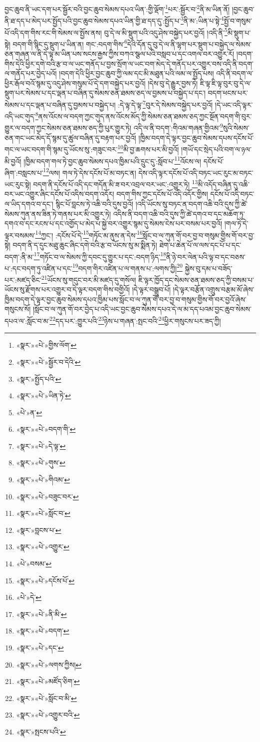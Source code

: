 བྱང་ཆུབ་ནི་ཡང་དག་པར་སྦྱོར་བའི་བྱང་ཆུབ་སེམས་དཔའ་ཡིན་:གྱི་ལྡོག་\footnote{«སྣར་»«པེ་»གྱིས་ལོག་}པར་:སྦྱོར་བ་\footnote{«སྣར་»«པེ་»སྦྱོར་བ་དེའི་}ནི་མ་ཡིན་ནོ། །བྱང་ཆུབ་ནི་ཐ་དད་པ་མེད་པར་སྤྱོད་པའི་བྱང་ཆུབ་སེམས་དཔའ་ཡིན་གྱི་ཐ་དད་དུ་:སྤྱོད་པ་\footnote{«སྣར་»སྤྱོད་པའི་}ནི་མ་:ཡིན་པ་སྟེ་\footnote{«སྣར་»«པེ་»ཡིན་ཏེ་}སྤྱོ་བ་གསུམ་པོ་འདི་དག་གིས་རང་གི་སེམས་ལ་སྤྱོས་ནས། བུ་དེ་ལ་མི་སྡུག་པའི་འདུ་ཤེས་བསྐྱེད་པར་བྱའོ། །འདི་ནི་\footnote{«པེ་»ན་}མི་སྡུག་པ་སྟེ། བདག་གི་སྙིང་དུ་སྡུག་པ་ཡིན་ན། གང་:བདག་གིས་\footnote{«སྣར་»«པེ་»བདག་གི་}དེའི་དོན་དུ་བུ་དེ་ལ་ནི་ལྷག་པར་སྡུག་པ་བསྐྱེད་ལ་སེམས་ཅན་གཞན་ལ་ནི་དེ་ལྟ་མ་ཡིན་པས་སངས་རྒྱས་ཀྱིས་བཀའ་སྩལ་པའི་བསླབ་པ་དང་འགལ་བར་འགྱུར་རོ། །བདག་གིས་དེའི་ཕྱིར་དགེ་བའི་རྩ་བ་ལ་ཡང་གནོད་པ་བྱས་སྲོག་ལ་ཡང་བག་མེད་དེ་གནོད་པར་འགྱུར་བས་འདི་ནི་བདག་ལ་གནོད་པར་བྱེད་པའོ། །བདག་དེའི་ཕྱིར་བྱང་ཆུབ་ཀྱི་ལམ་དང་མི་མཐུན་པའི་ལམ་ལ་སྤྱོད་པས། འདི་ནི་བདག་ལ་ཕྱིར་རྒོལ་བའོ་སྙམ་དུ་འདུ་ཤེས་གསུམ་པོ་དེ་དག་བསྐྱེད་པར་བྱའོ། །དེས་བུ་དེ་རྒྱུར་བྱས་ཏེ། ཇི་ལྟ་ཇི་ལྟ་བུར་བུ་དེ་ལ་སྡུག་པར་སེམས་པ་དང་ལྡན་པ་བཞིན་དུ་སེམས་ཅན་ཐམས་ཅད་ལ་བྱམས་པ་བསྐྱེད་པ་དང་། བདག་ཕངས་པར་སེམས་པ་དང་ལྡན་པ་བཞིན་དུ་བྱམས་པ་བསྐྱེད་པ། :དེ་ལྟ་དེ་ལྟ་\footnote{«སྣར་»«པེ་»དེ་ལྟ་}བུར་དེ་སེམས་བསྐྱེད་པར་བྱའོ། །དེ་ཡང་འདི་ལྟར་འདི་ཡང་གུད་\footnote{«སྣར་»«པེ་»གུས་}ནས་འོངས་ལ་བདག་ཀྱང་གུད་ནས་འོངས་མོད་ཀྱི་སེམས་ཅན་ཐམས་ཅད་ཀྱང་སྔོན་བདག་གི་བུར་གྱུར་ལ་བདག་ཀྱང་སེམས་ཅན་ཐམས་ཅད་ཀྱི་པུར་གྱུར་ཏེ། འདི་ལ་ནི་བདག་:གིའམ་གཞན་གྱིའམ་\footnote{«སྣར་»«པེ་»གིའམ་}སུའི་སེམས་ཅན་གང་ཡང་མེད་དོ་སྙམ་དུ་ཚུལ་བཞིན་དུ་བརྟག་པར་བྱའོ། །ཁྱིམ་བདག་དེ་ལྟར་བྱང་ཆུབ་སེམས་དཔས་དངོས་པོ་གང་ལ་ཡང་བདག་གི་སྙམ་དུ་ཡོངས་སུ་:གཟུང་བར་\footnote{«སྣར་»«པེ་»བཟུང་བར་}མི་བྱ་ཆགས་པར་མི་བྱའོ། །གཡོ་དང་སྲེད་པའི་བག་ལ་ཉལ་མི་བྱའོ། །ཁྱིམ་བདག་གལ་ཏེ་བྱང་ཆུབ་སེམས་དཔའ་ཁྱིམ་པའི་དྲུང་དུ་:སློབ་པ་\footnote{«སྣར་»«པེ་»སློང་བ་}འོངས་ལ། དངོས་པོ་ཞིག་:བསླངས་པ་\footnote{«སྣར་»བླངས་པ་}ལས། གལ་ཏེ་དེས་དངོས་པོ་མ་བཏང་ན། དེས་འདི་ལྟར་དངོས་པོ་འདི་བཏང་ཡང་རུང་མ་བཏང་ཡང་རུང་སྟེ། བདག་ནི་དངོས་པོ་འདི་དང་གདོན་མི་ཟ་བར་འབྲལ་བར་ཡང་:འགྱུར་ཏེ། \footnote{«སྣར་»«པེ་»འགྱུར་}མི་འདོད་བཞིན་དུ་འཆི་བར་ཡང་འགྱུར་ཞིང་དངོས་པོ་འདིས་བདག་འདོར། བདག་གིས་ཀྱང་དངོས་པོ་འདི་འདོར་གྱིས། དངོས་པོ་འདི་བཏང་ལ་ཡིད་དགའ་བ་དང་། སྙིང་པོ་བླངས་ཏེ་འཆི་བའི་དུས་བྱའོ། །འདི་ཡོངས་སུ་བཏང་ན་བདག་འཆི་བའི་དུས་ཀྱི་ཚེ་སེམས་ཀུན་ནས་ཟིན་ཏེ་གནས་པར་མི་འགྱུར་ཏེ། འདིས་ནི་བདག་འཆི་བའི་དུས་ཀྱི་ཚེ་དགའ་བ་དང་མཆོག་ཏུ་དགའ་བ་དང་རངས་པ་དང་འགྱོད་པ་མེད་པ་སྐྱེ་བར་འགྱུར་སྙམ་དུ་སེམས་ངེས་པར་བསམ་པར་བྱའོ། །གལ་ཏེ་དེ་ལྟར་བསམས་\footnote{«པེ་»བསམ་}ཀྱང་། :དངོས་པོ་དེ་\footnote{«སྣར་»«པེ་»དངོས་པོ་}གཏོང་མ་ནུས་ན་དེས་\footnote{«པེ་»དེ་}སློང་བ་ལ་ཀུན་གོ་བར་བྱ་བ་གསུམ་གྱིས་གོ་བར་བྱ་སྟེ། བདག་ནི་ད་དུང་མཐུ་ཆུང་ཞིང་དགེ་བའི་རྩ་བ་ཡོངས་སུ་མ་སྨིན་ཏེ། ཐེག་པ་ཆེན་པོ་ལ་ལས་དང་པོ་པ་དང་བདག་:ནི་མ་\footnote{«སྣར་»«པེ་»ནི་མི་}གཏོང་བ་ལ་སེམས་ཀྱི་དབང་དུ་གྱུར་པ་དང་:བདག་ཉིད་\footnote{«སྣར་»«པེ་»བདག་}ནི་ཉེ་བར་ལེན་པའི་ལྟ་བ་དང་བཅས་པ་:དང་བདག་ཏུ་འཛིན་པ་དང་\footnote{«སྣར་»«པེ་»དང་}བདག་གིར་འཛིན་པ་ལ་གནས་པ་:ལགས་ཀྱི།\footnote{«སྣར་»«པེ་»ལགས་ཀྱིས།} སྐྱེས་བུ་དམ་པ་བཟོད་པར་:མཛད་ཅིང་\footnote{«སྣར་»«པེ་»མཛོད་ཅིག་}ཡོངས་སུ་གདུང་བར་མི་མཛད་དུ་གསོལ། ཇི་ལྟར་ཁྱོད་དང་སེམས་ཅན་ཐམས་ཅད་ཀྱི་བསམ་པ་ཡོངས་སུ་རྫོགས་པར་འགྱུར་བ་དེ་ལྟར་བདག་གིས་བགྱིའོ། །དེ་ལྟར་བསྒྲུབ་པོ། །དེ་ལྟར་བརྩོན་འགྲུས་བརྩམ་མོ་ཞེས་ཁྱིམ་བདག་དེ་ལྟར་བྱང་ཆུབ་སེམས་དཔའ་ཁྱིམ་པས་སློང་བ་ལ་ཀུན་གོ་བར་བྱ་བ་གསུམ་གྱིས་གོ་བར་བྱའོ་ཞེས་གསུངས་སོ། །སློང་བ་ལ་ཀུན་གོ་བར་བྱེད་པ་འདི་ཡང་བྱང་ཆུབ་སེམས་དཔའ་དེ་ལ་མ་དད་པའམ་བྱང་ཆུབ་སེམས་དཔའ་ལ་:སློང་བ་མ་\footnote{«སྣར་»«པེ་»སློང་བ་མི་}དད་པར་:གྱུར་པའི་\footnote{«སྣར་»«པེ་»འགྱུར་བའི་}ཉེས་པ་གཞན་:སྤང་བའི་\footnote{«སྣར་»སྤངས་པའི་}ཕྱིར་གསུངས་པར་ཟད་ཀྱི། 